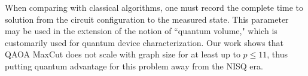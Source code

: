 When comparing with classical algorithms, one must record the complete time to solution from the  circuit configuration to the measured state. This parameter may be used in the extension of the notion of ``quantum volume," which is customarily used for quantum device characterization.
Our work shows that QAOA MaxCut does not scale with graph size for at least up to $p\leq11$, thus putting quantum advantage for this problem away from the NISQ era.




